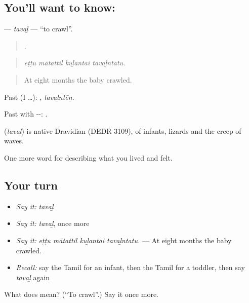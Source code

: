 \subsection*{You'll want to know: }
\textbf{} — \emph{tavaḻ} — \textquotedblleft{}to crawl\textquotedblright{}.

\begin{quote}
   .
\end{quote}

\begin{quote}
\emph{eṭṭu mātattil kuḻantai tavaḻntatu.}
\end{quote}

\begin{quote}
At eight months the baby crawled.
\end{quote}

Past (I …): , \emph{tavaḻntēṉ}.

Past with --: .

\begin{cousinweb}
\textbf{} (\emph{tavaḻ}) is native Dravidian (DEDR 3109), of infants, lizards and the creep of waves.
\end{cousinweb}

\begin{grammarlens}[title={What you've built}]
One more word for describing what you lived and felt.
\end{grammarlens}

\subsection*{Your turn}
\begin{itemize}
\raggedright
  \item \emph{Say it:} \emph{tavaḻ}
  \item \emph{Say it:} \emph{tavaḻ}, once more
  \item \emph{Say it:} \emph{eṭṭu mātattil kuḻantai tavaḻntatu.} — At eight months the baby crawled.
  \item \emph{Recall:} say the Tamil for an infant, then the Tamil for a toddler, then say \emph{tavaḻ} again
\end{itemize}

\begin{tcolorbox}[breakable,colback=teal!4,colframe=teal!35!black,title={Before you move on}]
What does  mean? (\textquotedblleft{}To crawl\textquotedblright{}.) Say it once more.
\end{tcolorbox}
